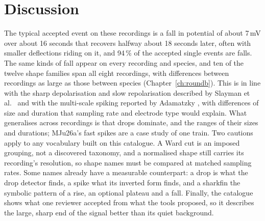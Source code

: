 \section{Discussion}

The typical accepted event on these recordings is a fall in potential of about 7\,mV over about 16 seconds that recovers halfway about 18 seconds later, often with smaller deflections riding on it, and 94\,\% of the accepted single events are falls. The same kinds of fall appear on every recording and species, and ten of the twelve shape families span all eight recordings, with differences between recordings as large as those between species (Chapter~\ref{ch:roundb}). This is in line with the sharp depolarisation and slow repolarisation described by Slayman et al.\ \cite{slayman} and with the multi-scale spiking reported by Adamatzky \cite{adamatzky2023}, with differences of size and duration that sampling rate and electrode type would explain. What generalises across recordings is that drops dominate, and the ranges of their sizes and durations; MJu26a's fast spikes are a case study of one train. Two cautions apply to any vocabulary built on this catalogue. A Ward cut is an imposed grouping, not a discovered taxonomy, and a normalised shape still carries its recording's resolution, so shape names must be compared at matched sampling rates. Some names already have a measurable counterpart: a drop is what the drop detector finds, a spike what its inverted form finds, and a sharkfin the symbolic pattern of a rise, an optional plateau and a fall. Finally, the catalogue shows what one reviewer accepted from what the tools proposed, so it describes the large, sharp end of the signal better than its quiet background.


